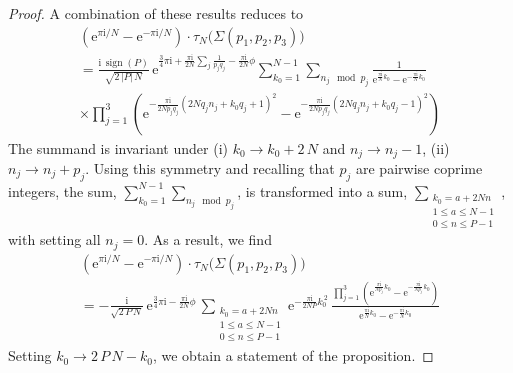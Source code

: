 \documentclass[12pt,reqno]{amsart}
\numberwithin{equation}{section}
\DeclareMathOperator{\sign}{sign}
\begin{document}
\begin{proof}
  A combination of  these results reduces to
  \begin{multline*}
    \left(
      \mathrm{e}^{\pi \mathrm{i}/N}
      -
      \mathrm{e}^{- \pi \mathrm{i}/N}
    \right) \cdot
    \tau_N \bigl(
    \Sigma(p_1, p_2, p_3)
    \bigr)
    \\
    =
    \frac{\mathrm{i} \, \sign(P)}{
      \sqrt{2 \, |P| \, N}}
    \,
    \mathrm{e}^{
      \frac{3}{4} \pi \mathrm{i} 
      +\frac{\pi \mathrm{i}}{2 N} \sum_j \frac{1}{p_j q_j}
      -
      \frac{\pi \mathrm{i}}{2 N} \phi
    }
    \sum_{k_0=1}^{N-1}
    \sum_{n_j \mod p_j}
    \frac{1}{
      \mathrm{e}^{\frac{\pi \mathrm{i}}{N} k_0}
      -
      \mathrm{e}^{- \frac{\pi \mathrm{i}}{N} k_0}
    }
    \,
    \\
    \times
    \prod_{j=1}^3
    \left(
      \mathrm{e}^{-\frac{\pi \mathrm{i}}{2 N p_j q_j}
        (2 N q_j n_j + k_0 q_j +1)^2
      }
      -
      \mathrm{e}^{-\frac{\pi \mathrm{i}}{2 N p_j q_j}
        (2 N q_j n_j + k_0 q_j -1)^2
      }
    \right)
  \end{multline*}
  The summand is invariant under
  (i)
  $k_0 \to k_0 + 2 \, N$
  and
  $n_j\to n_j -1$,
  (ii)
  $n_j  \to n_j + p_j$.
  Using this symmetry and
  recalling that $p_j$ are pairwise coprime integers,
  the sum,
  $\sum_{k_0=1}^{N-1}
  \sum_{n_j \mod{ p_j}}$,
  is transformed into
  a sum,
  $\sum_{
    \substack{
      k_0 = a + 2 N n \\
      1 \leq a \leq N-1 \\
      0 \leq n \leq P-1
    }}
  $, with setting all $n_j=0$.
  As a result, we find
  \begin{multline*}
    \left(
      \mathrm{e}^{\pi \mathrm{i}/N}
      -
      \mathrm{e}^{- \pi \mathrm{i}/N}
    \right) \cdot
    \tau_N \bigl(
    \Sigma(p_1, p_2, p_3)
    \bigr)
    \\
    =
    -\frac{\mathrm{i}}{
      \sqrt{2 \, P \, N}}
    \,
    \mathrm{e}^{
      \frac{3}{4} \pi \mathrm{i} 
      -
      \frac{\pi \mathrm{i}}{2 N} \phi
    }
    \,
    \sum_{
      \substack{
        k_0 = a + 2 N n \\
        1 \leq a \leq N-1 \\
        0 \leq n \leq P-1
      }}
    \mathrm{e}^{-\frac{\pi \mathrm{i}}{2 N P} k_0^{~2}}
    \,
    \frac{
    \prod_{j=1}^3
    \left(
      \mathrm{e}^{\frac{\pi \mathrm{i}}{N p_j} k_0}
      -
      \mathrm{e}^{-\frac{\pi \mathrm{i}}{N p_j} k_0}
    \right)
    }{
      \mathrm{e}^{\frac{\pi \mathrm{i}}{N} k_0}
      -
      \mathrm{e}^{- \frac{\pi \mathrm{i}}{N} k_0}
    }
  \end{multline*}
  Setting $k_0\to 2 \, P \, N- k_0$, we obtain a statement of the proposition.
\end{proof}
\end{document}
